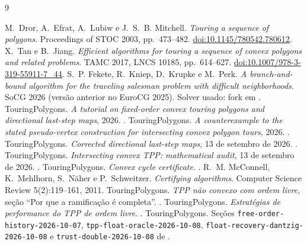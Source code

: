 \documentclass[11pt,a4paper]{article}
\theoremstyle{plain}\newtheorem{proposicao}{Proposição}
\theoremstyle{definition}\newtheorem{definicao}{Definição}
\theoremstyle{plain}\newtheorem{teorema}{Teorema}
\newcommand{\code}[1]{\texttt{\small #1}}
\begin{document}
\clearpage
\begin{thebibliography}{9}\small\raggedright
{} M.~Dror, A.~Efrat, A.~Lubiw e J.~S.~B. Mitchell. \emph{Touring a sequence of polygons}. Proceedings of STOC 2003, pp.~473--482. \href{https://doi.org/10.1145/780542.780612}{doi:10.1145/780542.780612}.
 X.~Tan e B.~Jiang. \emph{Efficient algorithms for touring a sequence of convex polygons and related problems}. TAMC 2017, LNCS 10185, pp.~614--627. \href{https://doi.org/10.1007/978-3-319-55911-7_44}{doi:10.1007/978-3-319-55911-7\_44}.
 S.~P. Fekete, R.~Kniep, D.~Krupke e M.~Perk. \emph{A branch-and-bound algorithm for the traveling salesman problem with difficult neighborhoods}. SoCG 2026 (versão anterior no EuroCG 2025). Solver usado: fork em .
 TouringPolygons. \emph{A tutorial on fixed-order convex touring polygons and directional last-step maps}, 2026. .
 TouringPolygons. \emph{A counterexample to the stated pseudo-vertex construction for intersecting convex polygon tours}, 2026. .
 TouringPolygons. \emph{Corrected directional last-step maps}, 13 de setembro de 2026. .
 TouringPolygons. \emph{Intersecting convex TPP: mathematical audit}, 13 de setembro de 2026. .
 TouringPolygons. \emph{Convex cycle certificate}. .
 R.~M. McConnell, K.~Mehlhorn, S.~Näher e P.~Schweitzer. \emph{Certifying algorithms}. Computer Science Review 5(2):119--161, 2011.
 TouringPolygons. \emph{TPP não convexo com ordem livre}, seção ``Por que a ramificação é completa''. .
 TouringPolygons. \emph{Estratégias de performance do TPP de ordem livre}. .
 TouringPolygons. Seções \code{free-order-history-2026-10-07}, \code{tpp-float-oracle-2026-10-08}, \code{float-recovery-dantzig-2026-10-08} e \code{trust-double-2026-10-08} de .
\end{thebibliography}
\end{document}
